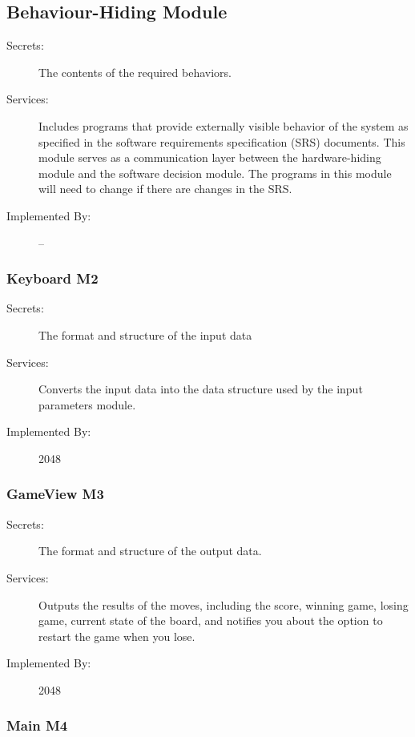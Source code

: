 \documentclass[12pt]{article}
\begin{document}
\subsection{Behaviour-Hiding Module}

\begin{description}
\item[Secrets:]The contents of the required behaviors.
\item[Services:]Includes programs that provide externally visible behavior of
  the system as specified in the software requirements specification (SRS)
  documents. This module serves as a communication layer between the
  hardware-hiding module and the software decision module. The programs in this
  module will need to change if there are changes in the SRS.
\item[Implemented By:] --
\end{description}

\subsubsection{Keyboard \textbf{M2}}

\begin{description}
\item[Secrets:]The format and structure of the input data
\item[Services:]Converts the input data into the data structure used by the
  input parameters module.
\item[Implemented By:] 2048
\end{description}

\subsubsection{GameView \textbf{M3}}

\begin{description}
\item[Secrets:]The format and structure of the output data.
\item[Services:]Outputs the results of the moves, including the score, winning game, losing game, current state of the board, and notifies you about the option to restart the game when you lose. 
\item[Implemented By:] 2048
\end{description}

\subsubsection{Main \textbf{M4}}
\end{document}
